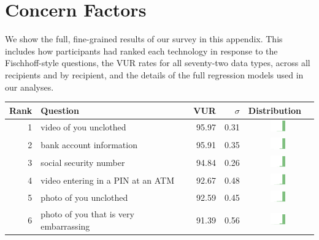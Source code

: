 
\section{Concern Factors}
\label{sec:concerns-appendix} 
We show the full, fine-grained results of our survey in this appendix. This includes how participants had ranked each technology in response to the Fischhoff-style questions, the VUR rates for all seventy-two data types, across all recipients and by recipient, and the details of the full regression models used in our analyses. 

\begin{table}[t]
\begin{center}
\small
\begin{tabular}{| r | l | r | r | r | r |}
\hline
Rank & Question & VUR & $\sigma$ & Distribution \\
\hline
1 & video of you unclothed & 95.97 & 0.31 &  \includegraphics[width = 2cm, height = 0.5cm]{tex-inputs/table-images/tookavideoofyouunclothedcombined} \\ 
2 & bank account information & 95.91 & 0.35 & \includegraphics[width = 2cm, height = 0.5cm]{tex-inputs/table-images/learnedyourbankaccountinformationcombined} \\ 
3 & social security number & 94.84 & 0.26 & \includegraphics[width = 2cm, height = 0.5cm]{tex-inputs/table-images/learnedyoursocialsecuritynumbercombined} \\ 
4 & video entering in a PIN at an ATM & 92.67 & 0.48 &  \includegraphics[width = 2cm, height = 0.5cm]{tex-inputs/table-images/tookavideoofyouenteringinyourPINatanATMcombined} \\ 
5 & photo of you unclothed & 92.59 & 0.45 &  \includegraphics[width = 2cm, height = 0.5cm]{tex-inputs/table-images/tookaphotoofyouunclothedcombined} \\ 
6 & photo of you that is very embarrassing & 91.39 & 0.56 &  \includegraphics[width = 2cm, height = 0.5cm]{tex-inputs/table-images/tookanincriminatingphotoofyoudoingsomethingembarrassingcombined} \\ 

\end{tabular}
\end{center}
\end{table}
